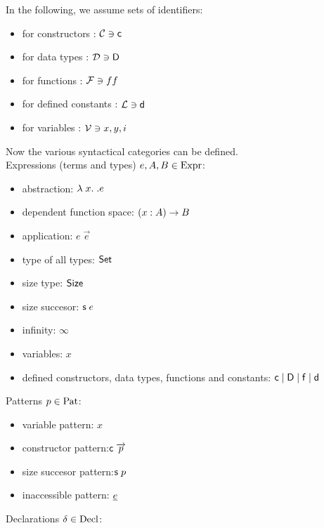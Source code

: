 In the following, we assume sets of identifiers:
\begin{itemize}
\item for constructors : $\mathcal{C} \ni \mathsf{c}$ 
\item for data types : $\mathcal{D} \ni \mathsf{D} $
\item for functions : $\mathcal{F} \ni ff$
\item for defined constants : $\mathcal{L} \ni \mathsf{d}$
\item for variables : $\mathcal{V} \ni x,y,i$
\end{itemize}
Now the various syntactical categories can be defined.
\\
Expressions (terms and types) $e,A,B \in \mathrm{Expr}$:  
\begin{itemize}
\item
abstraction: $ \lambda\; x .\; . e $ 
\item
dependent function space: $( x : A ) \rightarrow{B}$ 
\item 
application: $ e \; \vec{e} $ 
\item
type of all types: $ \mathsf{Set} $ 
\item
size type: $ \mathsf{Size} $ 
\item
size succesor: $\mathsf{s}\; e $ 
\item
infinity: $\infty$ 
\item
variables: $x$
\item
defined constructors, data types, functions and constants:
$ \mathsf{c} \;\vert\; \mathsf{D} \;\vert\; \mathsf{f} \;\vert\; \mathsf{d}$
\end{itemize}
Patterns $p \in \mathrm{Pat}$:
\begin{itemize}
\item
variable pattern: $x$ 
\item
constructor pattern:$ \mathsf{c} \; \overrightarrow{p} $ 
\item
size succesor pattern:$ \mathsf{s}\; p $ 
\item
inaccessible pattern: $ \underline{e} $ 
\end{itemize}
Declarations $\delta \in \mathrm{Decl}$:
